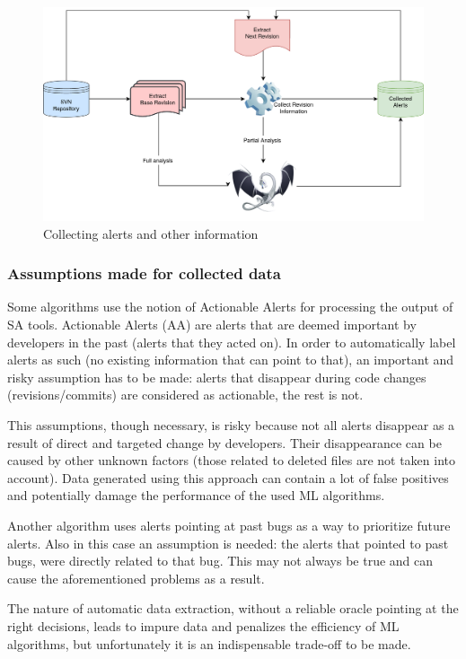 \begin{figure}[H]
	\centering
	\includegraphics[scale=0.2]{./src/collect_info.png}
	\caption{Collecting alerts and other information}
\end{figure}

\subsubsection{Assumptions made for collected data}
Some algorithms use the notion of Actionable Alerts for processing the output of SA tools. Actionable Alerts (AA) are alerts that are deemed important by developers in the past (alerts that they acted on). In order to automatically label alerts as such (no existing information that can point to that), an important and risky assumption has to be made: alerts that disappear during code changes (revisions/commits) are considered as actionable, the rest is not. 

This assumptions, though necessary, is risky because not all alerts disappear as a result of direct and targeted change by developers. Their disappearance can be caused by other unknown factors (those related to deleted files are not taken into account). Data generated using this approach can contain a lot of false positives and potentially damage the performance of the used ML algorithms.

Another algorithm uses alerts pointing at past bugs as a way to prioritize future alerts. Also in this case an assumption is needed: the alerts that pointed to past bugs, were directly related to that bug. This may not always be true and can cause the aforementioned problems as a result.

The nature of automatic data extraction, without a reliable oracle pointing at the right decisions, leads to impure data and penalizes the efficiency of ML algorithms, but unfortunately it is an indispensable trade-off to be made.

